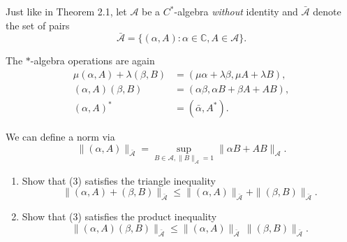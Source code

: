 \begin{Problem}
	Just like in Theorem 2.1, let $\mathcal{A}$ be a $C^*$-algebra \textit{without} identity and $\bar{\mathcal{A}}$ denote the set of pairs
	\begin{equation}
		\bar{\mathcal{A}} = \{ (\alpha, A) : \alpha \in \mathbb{C}, A \in \mathcal{A} \}.
	\end{equation}
	
	The $*$-algebra operations are again
	\begin{subequations}
		\begin{align}
			\mu(\alpha, A) + \lambda(\beta, B) &= (\mu \alpha + \lambda \beta, \mu A + \lambda B), \\
			(\alpha, A)(\beta, B) &= (\alpha \beta, \alpha B + \beta A + AB), \\
			(\alpha, A)^* &= (\bar{\alpha}, A^*).
		\end{align}
	\end{subequations}
	
	We can define a norm via
	\begin{equation}
		\|(\alpha, A)\|_{\bar{\mathcal{A}}} = \sup_{B \in \mathcal{A}, \|B\|_{\mathcal{A}} = 1} \|\alpha B + AB\|_{\mathcal{A}}.
	\end{equation}
	
	\begin{enumerate}
		\item Show that (3) satisfies the triangle inequality
		\begin{equation}
			\|(\alpha, A) + (\beta, B)\|_{\bar{\mathcal{A}}} \leq \|(\alpha, A)\|_{\bar{\mathcal{A}}} + \|(\beta, B)\|_{\bar{\mathcal{A}}}.
		\end{equation}
		
		\item Show that (3) satisfies the product inequality
		\begin{equation}
			\|(\alpha, A)(\beta, B)\|_{\bar{\mathcal{A}}} \leq \|(\alpha, A)\|_{\bar{\mathcal{A}}} \, \|(\beta, B)\|_{\bar{\mathcal{A}}}.
		\end{equation}
	\end{enumerate}
\end{Problem}
